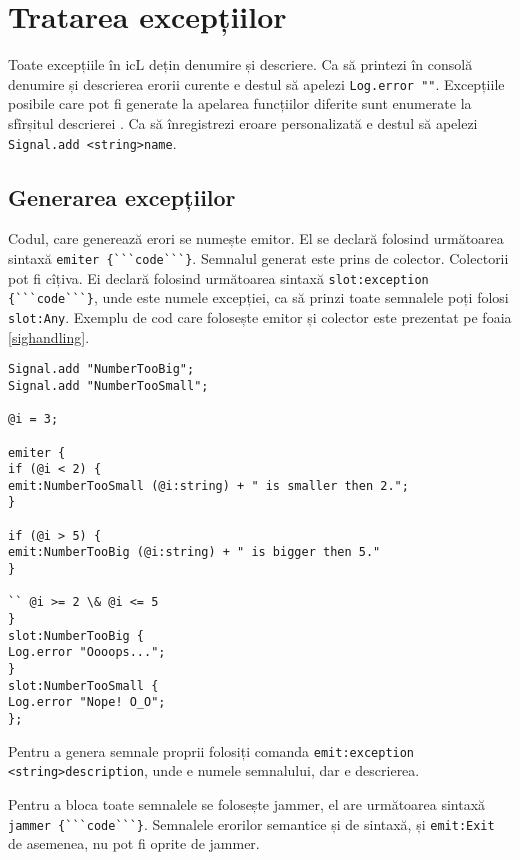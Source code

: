 \section{Tratarea excepțiilor}

Toate excepțiile în icL dețin denumire și descriere. Ca să printezi în consolă denumire și descrierea erorii curente e destul să apelezi \lstinline|Log.error ""|. Excepțiile posibile care pot fi generate la apelarea funcțiilor diferite sunt enumerate la sfîrșitul descrierei . Ca să înregistrezi eroare personalizată e destul să apelezi \lstinline|Signal.add <string>name|.

\subsection{Generarea excepțiilor}

Codul, care generează erori se numește emitor. El se declară folosind următoarea sintaxă \lstinline|emiter {```code```}|. Semnalul generat este prins de colector. Colectorii pot fi cîțiva. Ei declară folosind următoarea sintaxă \lstinline|slot:exception {```code```}|,
unde  este numele excepției, ca să prinzi toate semnalele poți folosi \lstinline|slot:Any|. Exemplu de cod care folosește emitor și colector este prezentat pe foaia \ref{sighandling}.

\begin{lstlisting}[caption=Prelucrarea excepțiilor, label=sighandling]
Signal.add "NumberTooBig";
Signal.add "NumberTooSmall";

@i = 3;

emiter {
if (@i < 2) {
emit:NumberTooSmall (@i:string) + " is smaller then 2.";
}

if (@i > 5) {
emit:NumberTooBig (@i:string) + " is bigger then 5."
}

`` @i >= 2 \& @i <= 5
}
slot:NumberTooBig {
Log.error "Oooops...";
}
slot:NumberTooSmall {
Log.error "Nope! O_O";
};
\end{lstlisting}

Pentru a genera semnale proprii folosiți comanda \lstinline|emit:exception <string>description|, unde  e numele semnalului, dar  e descrierea.

Pentru a bloca toate semnalele se folosește jammer, el are următoarea sintaxă \lstinline|jammer {```code```}|. Semnalele erorilor semantice și de sintaxă, și \lstinline|emit:Exit| de asemenea, nu pot fi oprite de jammer.

